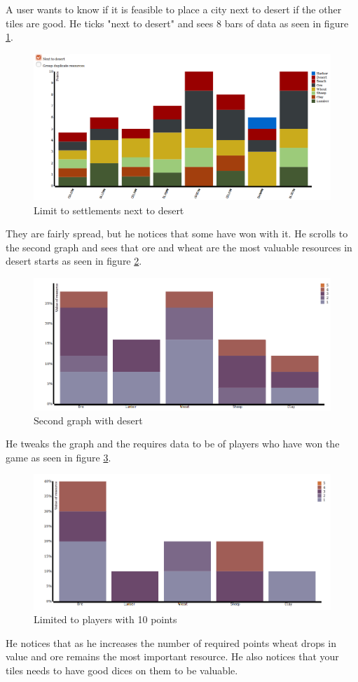 \documentclass[journal]{vgtc}                %
\begin{document}
A user wants to know if it is feasible to place a city next to desert if the
other tiles are good. He ticks "next to desert" and sees 8 bars of data as
seen in figure \ref{fig:s21}. 
\begin{figure}[!h]
  \centering
  \includegraphics[width=\linewidth]{scen2-1.png}
  \caption{Limit to settlements next to desert}
  \label{fig:s21}
\end{figure}
\noindent
They are fairly spread, but he notices that some have won with it. He
scrolls to the second graph and sees that ore and wheat are the most valuable
resources in desert starts as seen in figure \ref{fig:s22}. 
\begin{figure}[!h]
  \centering
  \includegraphics[width=\linewidth]{scen2-2.png}
  \caption{Second graph with desert}
  \label{fig:s22}
\end{figure}
\noindent
He tweaks the graph and the requires data to be
of players who have won the game as seen in figure \ref{fig:s23}. 
\begin{figure}[!h]
  \centering
  \includegraphics[width=\linewidth]{scen2-3.png}
  \caption{Limited to players with 10 points}
  \label{fig:s23}
\end{figure}
\noindent
He notices that as he increases the number
of required points wheat drops in value and ore remains the most important
resource. He also notices that your tiles needs to have good dices on them to
be valuable.
\end{document}
